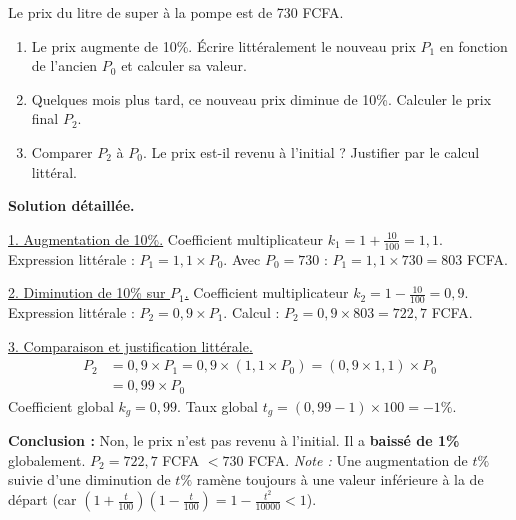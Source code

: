 \documentclass[11pt]{article}
\begin{document}
\begin{exoresolu}
Le prix du litre de super à la pompe est de 730 FCFA.
\begin{enumerate}
    \item Le prix augmente de 10\%. Écrire littéralement le nouveau prix $P_1$ en fonction de l'ancien $P_0$ et calculer sa valeur.
    \item Quelques mois plus tard, ce nouveau prix diminue de 10\%. Calculer le prix final $P_2$.
    \item Comparer $P_2$ à $P_0$. Le prix est-il revenu à l'initial ? Justifier par le calcul littéral.
\end{enumerate}
\tcblower
\textbf{Solution détaillée.}

\underline{1. Augmentation de 10\%.}
Coefficient multiplicateur $k_1 = 1 + \frac{10}{100} = 1,1$.
Expression littérale : $P_1 = 1,1 \times P_0$.
Avec $P_0 = 730$ : $P_1 = 1,1 \times 730 = 803$ FCFA.

\underline{2. Diminution de 10\% sur $P_1$.}
Coefficient multiplicateur $k_2 = 1 - \frac{10}{100} = 0,9$.
Expression littérale : $P_2 = 0,9 \times P_1$.
Calcul : $P_2 = 0,9 \times 803 = 722,7$ FCFA.

\underline{3. Comparaison et justification littérale.}
\begin{align*}
P_2 &= 0,9 \times P_1 = 0,9 \times (1,1 \times P_0) = (0,9 \times 1,1) \times P_0 \\
    &= 0,99 \times P_0
\end{align*}
Coefficient global $k_g = 0,99$.
Taux global $t_g = (0,99 - 1) \times 100 = -1\%$.

\textbf{Conclusion :} Non, le prix n'est pas revenu à l'initial. Il a \textbf{baissé de 1\%} globalement. $P_2 = 722,7$ FCFA $< 730$ FCFA.
\textit{Note :} Une augmentation de $t\%$ suivie d'une diminution de $t\%$ ramène toujours à une valeur inférieure à la de départ (car $ (1+\frac{t}{100})(1-\frac{t}{100}) = 1 - \frac{t^2}{10000} < 1 $).
\end{exoresolu}
\end{document}
